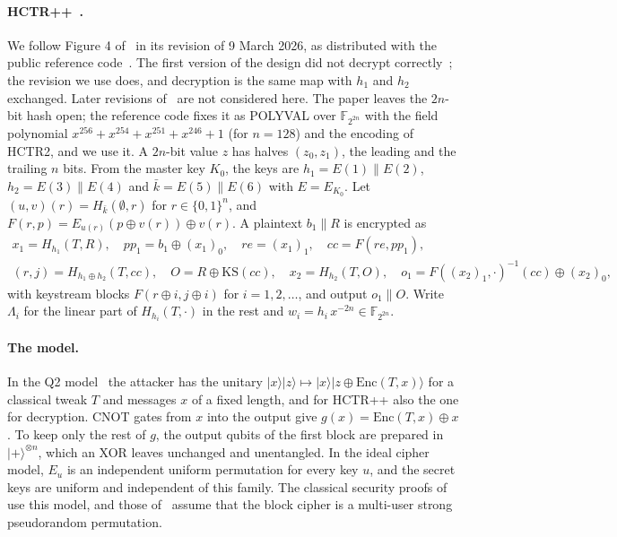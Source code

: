 \documentclass[11pt]{article}
\theoremstyle{definition}
\theoremstyle{remark}
\newcommand{\F}{\mathbb{F}}
\newcommand{\Enc}{\mathrm{Enc}}
\begin{document}
\paragraph{HCTR++~\cite{OKY26}.} We follow Figure 4 of~\cite{OKY26} in its revision of 9 March 2026, as distributed with the public reference code~\cite{OKYcode}. The first version of the design did not decrypt correctly~\cite{Kha26}; the revision we use does, and decryption is the same map with $h_1$ and $h_2$ exchanged. Later revisions of~\cite{OKY26} are not considered here. The paper leaves the $2n$-bit hash open; the reference code fixes it as POLYVAL over $\F_{2^{2n}}$ with the field polynomial $x^{256}+x^{254}+x^{251}+x^{246}+1$ (for $n=128$) and the encoding of HCTR2, and we use it. A $2n$-bit value $z$ has halves $(z_0,z_1)$, the leading and the trailing $n$ bits. From the master key $K_0$, the keys are $h_1=E(1)\|E(2)$, $h_2=E(3)\|E(4)$ and $\bar k=E(5)\|E(6)$ with $E=E_{K_0}$. Let $(u,v)(r)=H_{\bar k}(\emptyset,r)$ for $r\in\{0,1\}^n$, and $F(r,p)=E_{u(r)}(p\oplus v(r))\oplus v(r)$. A plaintext $b_1\|R$ is encrypted as
\begin{gather*}
x_1=H_{h_1}(T,R),\quad pp_1=b_1\oplus(x_1)_0,\quad re=(x_1)_1,\quad cc=F(re,pp_1),\\
(r,j)=H_{h_1\oplus h_2}(T,cc),\quad O=R\oplus\mathrm{KS}(cc),\quad x_2=H_{h_2}(T,O),\quad o_1=F((x_2)_1,\cdot)^{-1}(cc)\oplus(x_2)_0,
\end{gather*}
with keystream blocks $F(r\oplus i,j\oplus i)$ for $i=1,2,\dots$, and output $o_1\|O$. Write $\Lambda_i$ for the linear part of $H_{h_i}(T,\cdot)$ in the rest and $w_i=h_i\,x^{-2n}\in\F_{2^{2n}}$.

\paragraph{The model.} In the Q2 model~\cite{KLLN16} the attacker has the unitary $|x\rangle|z\rangle\mapsto|x\rangle|z\oplus\Enc(T,x)\rangle$ for a classical tweak $T$ and messages $x$ of a fixed length, and for HCTR++ also the one for decryption. CNOT gates from $x$ into the output give $g(x)=\Enc(T,x)\oplus x$. To keep only the rest of $g$, the output qubits of the first block are prepared in $|{+}\rangle^{\otimes n}$, which an XOR leaves unchanged and unentangled. In the ideal cipher model, $E_u$ is an independent uniform permutation for every key $u$, and the secret keys are uniform and independent of this family. The classical security proofs of~\cite{OKY26} use this model, and those of~\cite{CHMNSS26} assume that the block cipher is a multi-user strong pseudorandom permutation.
\end{document}
